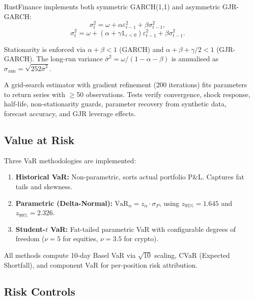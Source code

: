 \documentclass[11pt]{article}
\theoremstyle{definition}
\begin{document}
RustFinance implements both symmetric GARCH(1,1) and asymmetric
GJR-GARCH:
\begin{equation}
  \sigma_t^2 = \omega + \alpha \varepsilon_{t-1}^2 +
  \beta \sigma_{t-1}^2,
  \label{eq:garch}
\end{equation}
\begin{equation}
  \sigma_t^2 = \omega + (\alpha + \gamma \mathbb{1}_{\varepsilon < 0})
  \varepsilon_{t-1}^2 + \beta \sigma_{t-1}^2.
  \label{eq:gjr-garch}
\end{equation}

Stationarity is enforced via $\alpha + \beta < 1$ (GARCH) and
$\alpha + \beta + \gamma/2 < 1$ (GJR-GARCH). The long-run
variance $\bar{\sigma}^2 = \omega/(1 - \alpha - \beta)$ is
annualised as $\sigma_{\text{ann}} = \sqrt{252 \bar{\sigma}^2}$.

A grid-search estimator with gradient refinement (200 iterations)
fits parameters to return series with $\geq$50 observations.
Tests verify convergence, shock response, half-life, non-stationarity
guards, parameter recovery from synthetic data, forecast accuracy,
and GJR leverage effects.

\subsection{Value at Risk}

Three VaR methodologies are implemented:
\begin{enumerate}[leftmargin=*,topsep=2pt,itemsep=1pt]
  \item \textbf{Historical VaR:} Non-parametric, sorts actual
        portfolio P\&L. Captures fat tails and skewness.
  \item \textbf{Parametric (Delta-Normal):} $\text{VaR}_\alpha =
        z_\alpha \cdot \sigma_P$, using $z_{95\%} = 1.645$ and
        $z_{99\%} = 2.326$.
  \item \textbf{Student-$t$ VaR:} Fat-tailed parametric VaR with
        configurable degrees of freedom ($\nu = 5$ for equities,
        $\nu = 3.5$ for crypto).
\end{enumerate}

All methods compute 10-day Basel VaR via $\sqrt{10}$ scaling,
CVaR (Expected Shortfall), and component VaR for per-position
risk attribution.

\subsection{Risk Controls}
\end{document}
